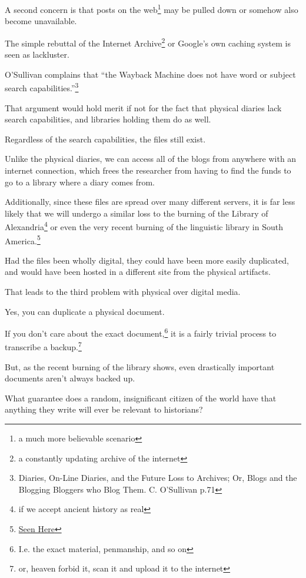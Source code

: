\documentclass[12pt]{article}[titlepage]
\newcommand{\say}[1]{``#1''}
\newcommand{\1}{\={a}}
\newcommand{\2}{\={e}}
\newcommand{\3}{\={\i}}
\newcommand{\4}{\=o}
\newcommand{\5}{\=u}
\newcommand{\6}{\={A}}
\renewcommand{\,}{\textsuperscript{,}}
\begin{document}
A second concern is that posts on the web\footnote{a much more believable scenario} may be pulled down or somehow also become unavailable.

The simple rebuttal of the Internet Archive\footnote{a constantly updating archive of the internet} or Google’s own caching system is seen as lackluster.

O’Sullivan complains that \say{the Wayback Machine does not have word or subject search capabilities.}\footnote{Diaries, On-Line Diaries, and the Future Loss to Archives; Or, Blogs and the Blogging Bloggers who Blog Them. C. O’Sullivan p.71}

That argument would hold merit if not for the fact that physical diaries lack search capabilities, and libraries holding them do as well.

Regardless of the search capabilities, the files still exist.

Unlike the physical diaries, we can access all of the blogs from anywhere with an internet connection, which frees the researcher from having to find the funds to go to a library where a diary comes from.


Additionally, since these files are spread over many different servers, it is far less likely that we will undergo a similar loss to the burning of the Library of Alexandria\footnote{if we accept ancient history as real} or even the very recent burning of the linguistic library in South America.\footnote{\href{https://www.nationalgeographic.com/science/2018/09/news-museu-nacional-fire-rio-de-janeiro-natural-history/}{Seen Here}}

Had the files been wholly digital, they could have been more easily duplicated, and would have been hosted in a different site from the physical artifacts.


That leads to the third problem with physical over digital media.

Yes, you can duplicate a physical document.

If you don’t care about the exact document,\footnote{I.e. the exact material, penmanship, and so on} it is a fairly trivial process to transcribe a backup.\footnote{or, heaven forbid it, scan it and upload it to the internet}

But, as the recent burning of the library shows, even drastically important documents aren’t always backed up.

What guarantee does a random, insignificant citizen of the world have that anything they write will ever be relevant to historians?
\end{document}
